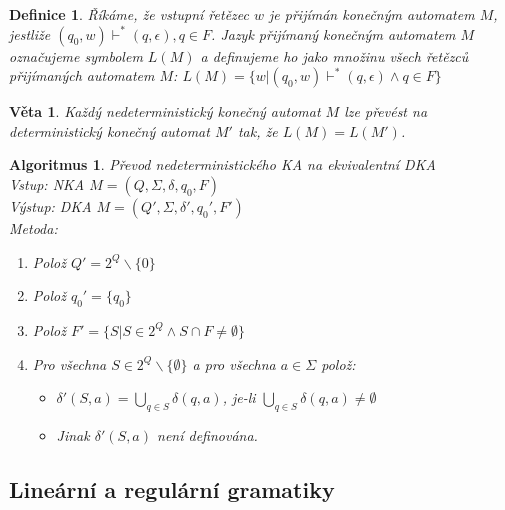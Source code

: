 \documentclass[a4paper, 11pt]{report}
\newtheorem{mydef}{Definice}[chapter]
\newtheorem{veta}{Věta}[chapter]
\newtheorem{alg}{Algoritmus}[chapter]
\begin{document}
\begin{mydef}
Říkáme, že vstupní řetězec $w$ je \emph{přijímán} konečným automatem $M$, jestliže $(q_0, w) \vdash^* (q, \epsilon), q \in F$. Jazyk přijímaný konečným automatem $M$ označujeme symbolem $L(M)$ a definujeme ho jako množinu všech řetězců přijímaných automatem $M$:
$L(M) = \{w | (q_0, w) \vdash^* (q, \epsilon) \land q \in F\}$
\end{mydef}

\begin{veta}
Každý \emph{nedeterministický} konečný automat $M$ lze převést na \emph{deterministický} konečný automat $M'$ tak, že $L(M) = L(M')$.
\end{veta}

\begin{alg}
Převod nedeterministického KA na ekvivalentní DKA\\
Vstup: NKA $M = (Q, \Sigma, \delta, q_0, F)$\\
Výstup: DKA $M = (Q', \Sigma, \delta', q_0', F')$\\
Metoda:
\begin{enumerate}
	\item Polož $Q' = 2^Q \backslash \{0\}$
	\item Polož $q_0' = \{q_0\}$
	\item Polož $F' = \{S | S \in 2^Q \land S \cap F \not= \emptyset\}$
	\item Pro všechna $S \in 2^Q \backslash \{\emptyset\}$ a pro všechna $a \in \Sigma$ polož:
	\begin{itemize}
		\item $\delta'(S, a) = \bigcup_{q \in S} \delta(q, a)$, je-li $\bigcup_{q \in S} \delta(q, a) \not= \emptyset$
		\item Jinak $\delta'(S, a)$ není definována.
	\end{itemize}
\end{enumerate}
\end{alg}

\subsection{Lineární a regulární gramatiky}
\end{document}
